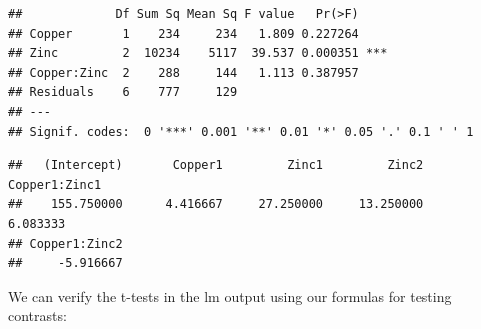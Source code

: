 \documentclass[
]{book}
\newenvironment{Shaded}{\begin{snugshade}}{\end{snugshade}}
\newcommand{\AttributeTok}[1]{\textcolor[rgb]{0.77,0.63,0.00}{#1}}
\newcommand{\FunctionTok}[1]{\textcolor[rgb]{0.00,0.00,0.00}{#1}}
\newcommand{\NormalTok}[1]{#1}
\newcommand{\OtherTok}[1]{\textcolor[rgb]{0.56,0.35,0.01}{#1}}
\newcommand{\SpecialCharTok}[1]{\textcolor[rgb]{0.00,0.00,0.00}{#1}}
\newcommand{\StringTok}[1]{\textcolor[rgb]{0.31,0.60,0.02}{#1}}
\begin{document}
\begin{Shaded}
\end{Shaded}

\begin{verbatim}
##             Df Sum Sq Mean Sq F value   Pr(>F)    
## Copper       1    234     234   1.809 0.227264    
## Zinc         2  10234    5117  39.537 0.000351 ***
## Copper:Zinc  2    288     144   1.113 0.387957    
## Residuals    6    777     129                     
## ---
## Signif. codes:  0 '***' 0.001 '**' 0.01 '*' 0.05 '.' 0.1 ' ' 1
\end{verbatim}

\begin{Shaded}
\end{Shaded}

\begin{verbatim}
##   (Intercept)       Copper1         Zinc1         Zinc2 Copper1:Zinc1 
##    155.750000      4.416667     27.250000     13.250000      6.083333 
## Copper1:Zinc2 
##     -5.916667
\end{verbatim}

We can verify the t-tests in the lm output using our formulas for testing contrasts:
\end{document}
